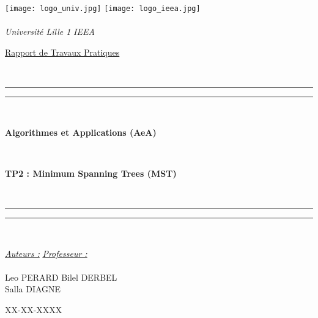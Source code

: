 \thispagestyle{cover}

\texttt{[image: logo\_univ.jpg]} \hfill \texttt{[image: logo\_ieea.jpg]} \\
~\\
\hspace*{0.5cm} {\Large \textit{Université Lille 1}} \hfill {\Large \textit{IEEA}} \hspace*{0.5cm}\\

\vspace*{17mm}

\begin{center}
	\begin{Huge} \underline{Rapport de Travaux Pratiques} \end{Huge}\\[4mm]

	\vspace*{15mm}

	\rule[0.5ex]{\linewidth}{2pt}\vspace*{-\baselineskip}\vspace*{3.2pt}
	\rule[0.5ex]{\linewidth}{1pt}\\[\baselineskip]

		\begin{Huge} \textbf{Algorithmes et Applications (AeA)} \end{Huge}\\[4mm]
		\begin{Huge} \textbf{TP2 : Minimum Spanning Trees (MST)} \end{Huge}\\[4mm]

	\rule[0.5ex]{\linewidth}{1pt}\vspace*{-\baselineskip}\vspace{3.2pt}
	\rule[0.5ex]{\linewidth}{2pt}\\

	\vspace*{20mm}

	{\large \textit{\underline{Auteurs :}}} \hfill {\large \textit{\underline{Professeur :}}}\\
	~\\
	{\large Leo PERARD} \hfill {\large Bilel DERBEL}\\
	{\large Salla DIAGNE} \hfill {\large}
	
	\vspace*{20mm}
	
	{\large\textsc{XX-XX-XXXX}}
\end{center}